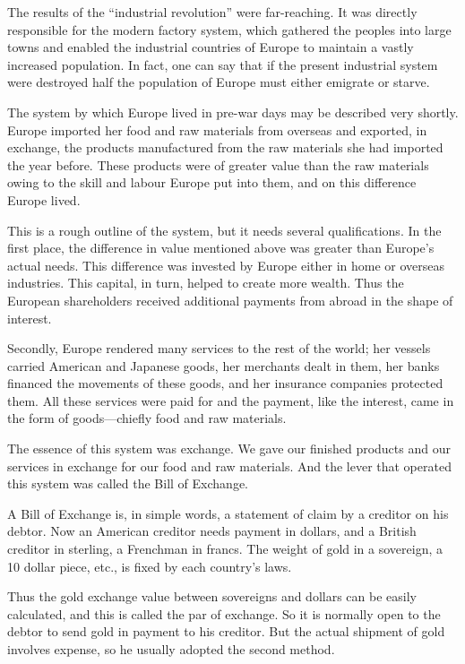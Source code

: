 \documentclass{book}
\begin{document}
The results of the “industrial revolution” were far-reaching. It was directly responsible for the modern factory system, which gathered the peoples into large towns and enabled the industrial countries of Europe to maintain a vastly increased population. In fact, one can say that if the present industrial system were destroyed half the population of Europe must either emigrate or starve.

The system by which Europe lived in pre-war days may be described very shortly. Europe imported her food and raw materials from overseas and exported, in exchange, the products manufactured from the raw materials she had imported the year before. These products were of greater value than the raw materials owing to the skill and labour Europe put into them, and on this difference Europe lived.

This is a rough outline of the system, but it needs several qualifications. In the first place, the difference in value mentioned above was greater than Europe’s actual needs. This difference was invested by Europe either in home or overseas industries. This capital, in turn, helped to create more wealth. Thus the European shareholders received additional payments from abroad in the shape of interest.

Secondly, Europe rendered many services to the rest of the world; her vessels carried American and Japanese goods, her merchants dealt in them, her banks financed the movements of these goods, and her insurance companies protected them. All these services were paid for and the payment, like the interest, came in the form of goods—chiefly food and raw materials.

The essence of this system was exchange. We gave our finished products and our services in exchange for our food and raw materials. And the lever that operated this system was called the Bill of Exchange.

A Bill of Exchange is, in simple words, a statement of claim by a creditor on his debtor. Now an American creditor needs payment in dollars, and a British creditor in sterling, a Frenchman in francs. The weight of gold in a sovereign, a 10 dollar piece, etc., is fixed by each country’s laws.

Thus the gold exchange value between sovereigns and dollars can be easily calculated, and this is called the par of exchange. So it is normally open to the debtor to send gold in payment to his creditor. But the actual shipment of gold involves expense, so he usually adopted the second method.
\end{document}

